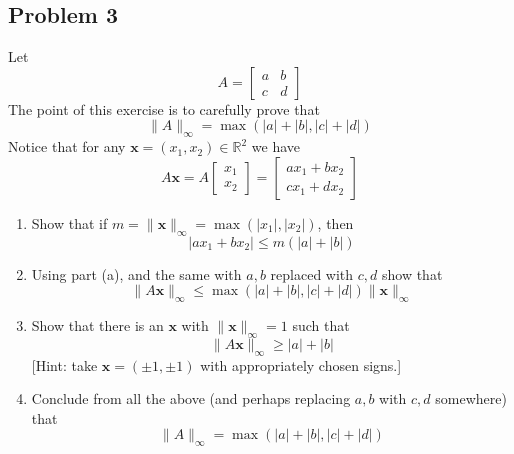 \documentclass{article}
\newcommand{\R}{{\mathbb R}}
\begin{document}
\subsection*{Problem 3}
Let
\[
	A = \begin{bmatrix} a & b \\ c & d \end{bmatrix}
\]
The point of this exercise is to carefully prove that
\[
	\lVert A \rVert_\infty = \max(|a| + |b|,|c| + |d|)
\]
Notice that for any $\mathbf{x} = (x_1,x_2) \in \R^2$ we have
\[
	A\mathbf{x} = A\begin{bmatrix} x_1 \\ x_2 \end{bmatrix}
	= \begin{bmatrix} ax_1 + bx_2 \\ cx_1 + dx_2 \end{bmatrix}
\]
\begin{enumerate}
	\item Show that if $m = \lVert \mathbf{x} \rVert_\infty
		= \max(|x_1|,|x_2|)$, then
		\[
			|ax_1 + bx_2| \leq m(|a| + |b|)
		\]
	\item Using part (a), and the same with $a,b$ replaced with $c,d$ show that
		\[
			\lVert A\mathbf{x} \rVert_\infty
			\leq \max(|a| + |b|,|c| + |d|)\lVert \mathbf{x}\rVert_\infty
		\]
	\item Show that there is an $\mathbf{x}$ with
		$\lVert \mathbf{x} \rVert_\infty = 1$ such that
		\[
			\lVert A\mathbf{x} \rVert_\infty \geq |a| + |b|
		\]
		[Hint: take $\mathbf{x} = (\pm1,\pm1)$ with appropriately chosen signs.]
	\item Conclude from all the above (and perhaps replacing $a,b$ with $c,d$ somewhere) that
		\[
			\lVert A \rVert_\infty = \max(|a| + |b|,|c| + |d|)
		\]
\end{enumerate}
\end{document}

